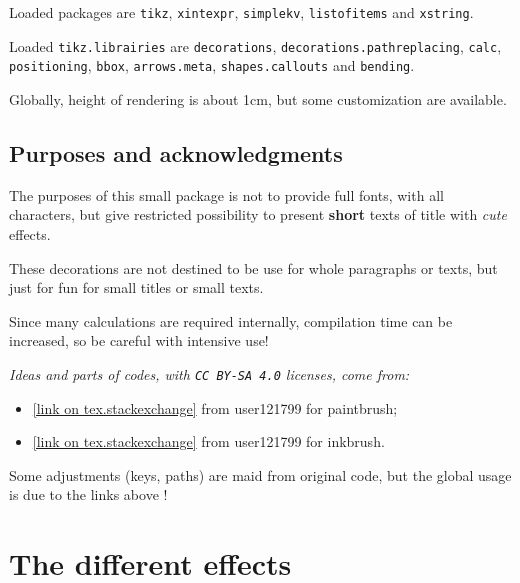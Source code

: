 \documentclass[11pt,a4paper]{ltxdoc}
\begin{document}
Loaded packages are \texttt{tikz}, \texttt{xintexpr}, \texttt{simplekv}, \texttt{listofitems} and \texttt{xstring}.

Loaded \texttt{tikz.librairies} are \texttt{decorations}, \texttt{decorations.pathreplacing}, \texttt{calc}, \texttt{positioning}, \texttt{bbox}, \texttt{arrows.meta}, \texttt{shapes.callouts} and \texttt{bending}.

\smallskip

Globally, height of rendering is about 1cm, but some customization are available.

\subsection{Purposes and acknowledgments}

The purposes of this small package is not to provide full fonts, with all characters, but give restricted possibility to present \textbf{short} texts of title with \textit{cute} effects.

\smallskip

These decorations are not destined to be use for whole paragraphs or texts, but just for fun for small titles or small texts.

\smallskip

Since many calculations are required internally, compilation time can be increased, so be careful with intensive use!

\smallskip

\textit{Ideas and parts of codes, with \texttt{CC\,BY-SA\,4.0} licenses, come from:}

\begin{itemize}
	\item \href{https://tex.stackexchange.com/questions/475141/simulating-paintbrush-strokes-in-tikz}{[link on tex.stackexchange]} from \textsf{user121799} for paintbrush;
	\item \href{https://tex.stackexchange.com/questions/460836/custom-line-cap-to-simulate-inked-line-in-tikz/460842#460842}{[link on tex.stackexchange]} from \textsf{user121799} for inkbrush.
\end{itemize}

Some adjustments (keys, paths) are maid from original code, but the global usage is due to the links above !

\pagebreak

\section{The different effects}
\end{document}
